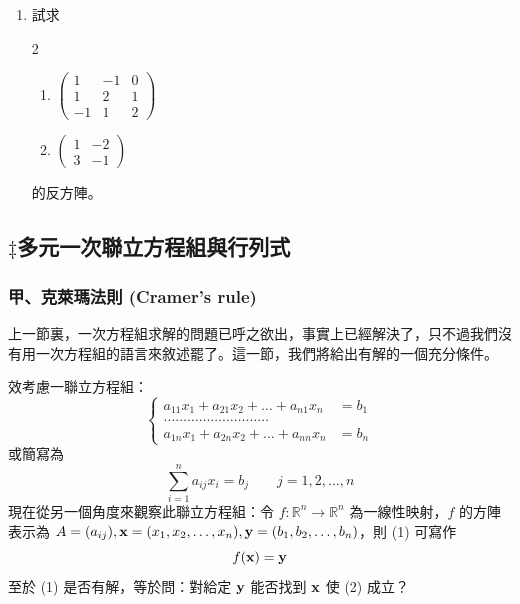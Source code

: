 \begin{enumerate}[label=\arabic*., leftmargin=2em]
  \item 試求
  \begin{multicols}{2}
  \begin{enumerate}[label=(\roman*)]
    \item $\begin{pmatrix} 1 & -1 & 0 \\ 1 & 2 & 1 \\ -1 & 1 & 2 \end{pmatrix}$
    \item $\begin{pmatrix} 1 & -2 \\ 3 & -1 \end{pmatrix}$
  \end{enumerate}
  \end{multicols}
  的反方陣。

\end{enumerate}

\subsection{\texorpdfstring{$\ddagger$}{‡}多元一次聯立方程組與行列式}\label{sec:b6s-1-8}
\resetsectcounters

\subsubsection*{甲、克萊瑪法則 (Cramer's rule)}\label{subsec:b6s-1-8-a}

上一節裏，一次方程組求解的問題已呼之欲出，事實上已經解決了，只不過我們沒有用一次方程組的語言來敘述罷了。這一節，我們將給出有解的一個充分條件。

效考慮一聯立方程組：
\begin{equation}
\left\{\begin{aligned}
a_{11}x_1 + a_{21}x_2 + \dots + a_{n1}x_n &= b_1 \\
\dots\dots\dots\dots\dots\dots\dots\dots\dots \\
a_{1n}x_1 + a_{2n}x_2 + \dots + a_{nn}x_n &= b_n
\end{aligned}\right. \label{eq:b6s-1-8-1}
\end{equation}
或簡寫為
\begin{equation}
\sum_{i=1}^n a_{ij} x_i = b_j \qquad j=1, 2, \dots, n \tag{1$'$} \label{eq:b6s-1-8-1p}
\end{equation}
現在從另一個角度來觀察此聯立方程組：令 $f: \mathbb{R}^n \longrightarrow \mathbb{R}^n$ 為一線性映射，$f$ 的方陣表示為 $A=(a_{ij}), \boldsymbol{\mathbf{x}}=(x_1, x_2, \dots, x_n), \boldsymbol{\mathbf{y}}=(b_1, b_2, \dots, b_n)$，則 (1) 可寫作
\begin{equation}
f(\boldsymbol{\mathbf{x}}) = \boldsymbol{\mathbf{y}} \label{eq:b6s-1-8-2}
\end{equation}
至於 (1) 是否有解，等於問：對給定 $\boldsymbol{\mathbf{y}}$ 能否找到 $\boldsymbol{\mathbf{x}}$ 使 (2) 成立？

